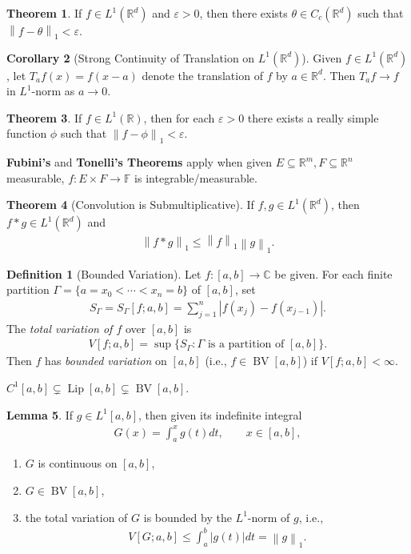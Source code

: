 \documentclass[a4paper,9pt]{extarticle}
\newcommand{\norm}[1]{\left\lVert#1\right\rVert}
\DeclareMathOperator*{\BV}{BV}
\DeclareMathOperator*{\Lip}{Lip}
\theoremstyle{definition}
\newtheorem{defin}{Definition}
\newtheorem{thm}{Theorem}
\newtheorem{lem}[thm]{Lemma}
\newtheorem{cor}[thm]{Corollary}
\begin{document}
\begin{thm}
    If $f \in L^1(\mathbb{R}^d)$ and $\varepsilon > 0$, then there exists $\theta \in C_c(\mathbb{R}^d)$ such that $\norm{f - \theta}_1 < \varepsilon$.
\end{thm}
\begin{cor}[Strong Continuity of Translation on $L^1(\mathbb{R}^d)$]
    Given $f \in L^1(\mathbb{R}^d)$, let $T_a f(x) = f(x - a)$ denote the translation of $f$ by $a \in \mathbb{R}^d$. Then $T_a f \to f$ in $L^1$-norm as $a \to 0$.
\end{cor}
\begin{thm}
    If $f \in L^1(\mathbb{R})$, then for each $\varepsilon > 0$ there exists a really simple function $\phi$ such that $\norm{f - \phi}_1 < \varepsilon$.
\end{thm}
\textbf{Fubini's} and \textbf{Tonelli's Theorems} apply when given $E \subseteq \mathbb{R}^m, F \subseteq \mathbb{R}^n$ measurable, $f : E \times F \to \mathbb{F}$ is integrable/measurable.
\begin{thm}[Convolution is Submultiplicative]
    If $f, g \in L^1(\mathbb{R}^d)$, then $f * g \in L^1(\mathbb{R}^d)$ and
    \begin{align*}
        \norm{f * g}_1 \leq \norm{f}_1 \norm{g}_1.
    \end{align*}
\end{thm}
\begin{defin}[Bounded Variation]
    Let $f: [a, b] \to \mathbb{C}$ be given. For each finite partition $\Gamma = \{ a = x_0 < \cdots < x_n = b \}$ of $[a, b]$, set
    \begin{align*}
        S_\Gamma = S_\Gamma[f; a, b] = \sum_{j = 1}^n |f(x_j) - f(x_{j - 1})|.
    \end{align*}
    The \emph{total variation of $f$} over $[a, b]$ is
    \begin{align*}
        V[f; a, b] = \sup\{ S_\Gamma : \Gamma \text{ is a partition of } [a, b] \}.
    \end{align*}
    Then $f$ has \emph{bounded variation} on $[a, b]$ (i.e., $f \in \BV[a, b]$) if $V[f; a, b] < \infty$.
\end{defin}
$C^1[a, b] \subsetneq \Lip[a, b] \subsetneq \BV[a, b]$.
\begin{lem}
    If $g \in L^1[a, b]$, then given its indefinite integral
    \begin{align*}
        G(x) = \int_a^x g(t) dt, \qquad x \in [a, b],
    \end{align*}
    \begin{enumerate}[itemsep=0ex, label=(\alph*)]
        \item
            $G$ is continuous on $[a, b]$,
        \item
            $G \in \BV[a, b]$,
        \item
            the total variation of $G$ is bounded by the $L^1$-norm of $g$, i.e.,
            \begin{align*}
                V[G; a, b] \leq \int_a^b |g(t)| dt = \norm{g}_1.
            \end{align*}
    \end{enumerate}
\end{lem}
\end{document}
